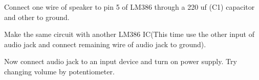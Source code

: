 \documentclass[journal,12pt,twocolumn]{IEEEtran}
\begin{document}
\begin{problem}
Connect one  wire of speaker to pin 5 of LM386 through a 220 uf (C1) capacitor and other to ground.
\end{problem}
\begin{problem}
Make the same circuit with another LM386 IC(This time use the other input of audio jack and connect remaining wire of audio jack to ground).
\end{problem}
\begin{problem}
Now connect audio jack to an input device and turn on power supply. Try changing volume by potentiometer.
\end{problem}
\end{document}
